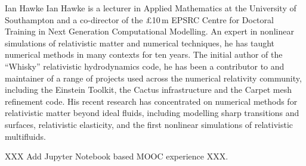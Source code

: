 \begin{participant}[PM=2,type=PI]{Ian Hawke}
Ian Hawke is a lecturer in Applied Mathematics at the University of
Southampton and a co-director of the $\pounds$10$\,$m EPSRC Centre for Doctoral
Training in Next Generation Computational Modelling. An expert in
nonlinear simulations of relativistic matter and numerical techniques,
he has taught numerical methods in many contexts for ten years. The
initial author of the “Whisky” relativistic hydrodynamics code, he has
been a contributor to and maintainer of a range of projects used
across the numerical relativity community, including the Einstein
Toolkit, the Cactus infrastructure and the Carpet mesh refinement
code. His recent research has concentrated on numerical methods for
relativistic matter beyond ideal fluids, including modelling sharp
transitions and surfaces, relativistic elasticity, and the first
nonlinear simulations of relativistic multifluids.

XXX Add Jupyter Notebook based MOOC experience XXX.
\end{participant}


